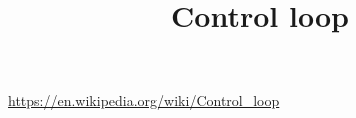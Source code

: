\documentclass[a4paper]{article}
\title{Control loop}
\date{}
\begin{document}
    \maketitle

    \url{https://en.wikipedia.org/wiki/Control_loop}
\end{document}
